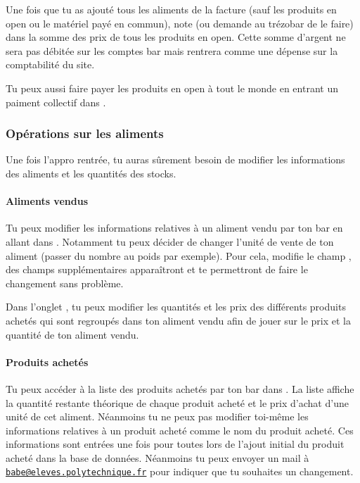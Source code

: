 \documentclass[12pt,french]{article}
\begin{document}
Une fois que tu as ajouté tous les aliments de la facture (sauf les produits en open ou le matériel payé en commun), note (ou demande au trézobar de le faire) dans  la somme des prix de tous les produits en open. Cette somme d'argent ne sera pas débitée sur les comptes bar mais rentrera comme une dépense sur la comptabilité du site.

Tu peux aussi faire payer les produits en open à tout le monde en entrant un paiment collectif dans .

\subsubsection{Opérations sur les aliments}

Une fois l'appro rentrée, tu auras sûrement besoin de modifier les informations des aliments et les quantités des stocks.

\paragraph{Aliments vendus} Tu peux modifier les informations relatives à un aliment vendu par ton bar en allant dans . Notamment tu peux décider de changer l'unité de vente de ton aliment (passer du nombre au poids par exemple). Pour cela, modifie le champ , des champs supplémentaires apparaîtront et te permettront de faire le changement sans problème.

Dans l'onglet , tu peux modifier les quantités et les prix des différents produits achetés qui sont regroupés dans ton aliment vendu afin de jouer sur le prix et la quantité de ton aliment vendu.

\paragraph{Produits achetés} Tu peux accéder à la liste des produits achetés par ton bar dans . La liste affiche la quantité restante théorique de chaque produit acheté et le prix d'achat d'une unité de cet aliment. Néanmoins tu ne peux pas modifier toi-même les informations relatives à un produit acheté comme le nom du produit acheté. Ces informations sont entrées une fois pour toutes lors de l'ajout initial du produit acheté dans la base de données. Néanmoins tu peux envoyer un mail à \href{mailto:babe@eleves.polytechnique.fr}{\texttt{babe@eleves.polytechnique.fr}} pour indiquer que tu souhaites un changement.
\end{document}
